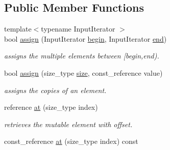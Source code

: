 \subsection*{Public Member Functions}
\begin{DoxyCompactItemize}
\item 
\hypertarget{classhryky_1_1_fixed_vector_abc3570645b1282b0e6a5264f610fd9bc}{{\footnotesize template$<$typename Input\-Iterator $>$ }\\bool \hyperlink{classhryky_1_1_fixed_vector_abc3570645b1282b0e6a5264f610fd9bc}{assign} (Input\-Iterator \hyperlink{classhryky_1_1_fixed_vector_ad90451d97fc185f8df9621dff03bbce8}{begin}, Input\-Iterator \hyperlink{classhryky_1_1_fixed_vector_a7e78bde51c918d8032e3d835f43713fc}{end})}\label{classhryky_1_1_fixed_vector_abc3570645b1282b0e6a5264f610fd9bc}

\begin{DoxyCompactList}\small\item\em assigns the multiple elements between \mbox{[}begin,end). \end{DoxyCompactList}\item 
\hypertarget{classhryky_1_1_fixed_vector_a1bf7588b15fe89dc8f04d843c4722e02}{bool \hyperlink{classhryky_1_1_fixed_vector_a1bf7588b15fe89dc8f04d843c4722e02}{assign} (size\-\_\-type \hyperlink{classhryky_1_1_fixed_vector_a5213839602f1eabaa2e8ad064407e6bc}{size}, const\-\_\-reference value)}\label{classhryky_1_1_fixed_vector_a1bf7588b15fe89dc8f04d843c4722e02}

\begin{DoxyCompactList}\small\item\em assigns the copies of an element. \end{DoxyCompactList}\item 
\hypertarget{classhryky_1_1_fixed_vector_ab3116fe8dc96c1b5b5aa829bcdc0ae35}{reference \hyperlink{classhryky_1_1_fixed_vector_ab3116fe8dc96c1b5b5aa829bcdc0ae35}{at} (size\-\_\-type index)}\label{classhryky_1_1_fixed_vector_ab3116fe8dc96c1b5b5aa829bcdc0ae35}

\begin{DoxyCompactList}\small\item\em retrieves the mutable element with offset. \end{DoxyCompactList}\item 
\hypertarget{classhryky_1_1_fixed_vector_adbb832c67227fbd95ede014e34ca0d55}{const\-\_\-reference \hyperlink{classhryky_1_1_fixed_vector_adbb832c67227fbd95ede014e34ca0d55}{at} (size\-\_\-type index) const }\label{classhryky_1_1_fixed_vector_adbb832c67227fbd95ede014e34ca0d55}


\end{DoxyCompactItemize}
